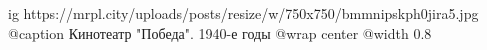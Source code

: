 
 
 
 
 

\ifcmt
  ig https://mrpl.city/uploads/posts/resize/w/750x750/bmmnipskph0jira5.jpg
	@caption Кинотеатр "Победа". 1940-е годы
  @wrap center
  @width 0.8
\fi
